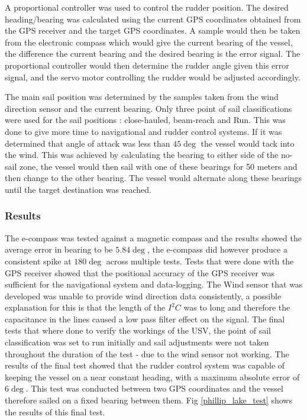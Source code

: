 A proportional controller was used to control the rudder position. The desired heading/bearing was calculated using the current GPS coordinates obtained from the 
GPS receiver and the target GPS coordinates. A sample would then be taken from the electronic compass which would give the current bearing of the vessel, the difference 
the current bearing and the desired bearing is the error signal. The proportional controller would then determine the rudder angle given this error signal, and the servo 
motor controlling the rudder would be adjusted accordingly. 

The main sail position was determined by the samples taken from the wind direction sensor and the current bearing. Only three point of sail classifications were used for the sail positions 
: close-hauled, beam-reach and Run. This was done to give more time to navigational and rudder control systems. If it was determined that angle of attack was less than $45\deg$
the vessel would tack into the wind. This was achieved by calculating the bearing to either side of the no-sail zone, the vessel would then sail with one of these bearings for 50 meters 
and then change to the other bearing. The vessel would alternate along these bearings until the target destination was reached.

\subsubsection{Results}
The e-compass was tested against a magnetic compass and the results showed the average error in bearing to be $5.84\deg$, the e-compass did however produce a consistent spike at $180\deg$ across
multiple tests. Tests that were done with the GPS receiver showed that the positional accuracy of the GPS receiver was sufficient for the navigational system and data-logging. The Wind sensor that
 was developed was unable to provide wind direction data consistently, a possible explanation for this is that the length of the $I^{2}C$ was to long and therefore the capacitance in the lines caused 
 a low pass filter effect on the signal. The final tests that where done to verify the workings of the USV, the point of sail classification was set to run initially and sail adjustments were not taken 
 throughout the duration of the test - due to the wind sensor not working. The results of the final test showed that the rudder control system was capable of keeping the vessel on a near constant 
 heading, with a maximum absolute error of $6\deg$. This test was conducted between two GPS coordinates and the vessel therefore sailed on a fixed bearing between them. Fig \ref{phillip_lake_test} shows
 the results of this final test.

